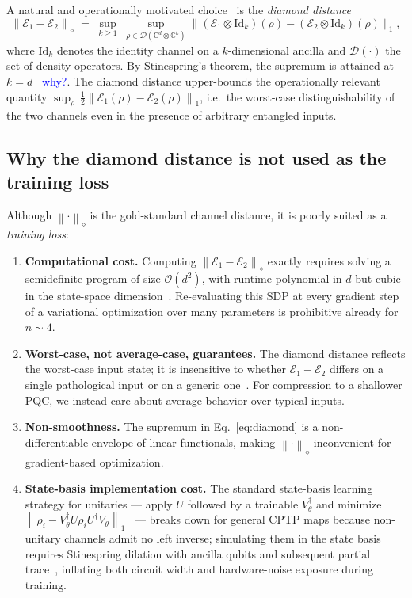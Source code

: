 \documentclass[%
 reprint,
superscriptaddress,
 amsmath,amssymb,
 aps,
]{revtex4-2}
\newcommand{\E}{\mathcal{E}}
\newcommand{\norm}[1]{\left\lVert#1\right\rVert}
\newcommand{\yijian}[1]{\textcolor{blue}{#1}}
\begin{document}
A natural and operationally motivated choice~\cite{kitaev1997quantum,watrous2018theory} is the \emph{diamond distance}
\begin{equation}
    \norm{\E_1 - \E_2}_{\diamond} \;=\; \sup_{k\ge 1}\;\sup_{\rho\in\mathcal{D}(\mathbb{C}^{d}\otimes \mathbb{C}^k)} \bigl\| (\E_1 \otimes \mathrm{Id}_k)(\rho) - (\E_2 \otimes \mathrm{Id}_k)(\rho) \bigr\|_1,
    \label{eq:diamond}
\end{equation}
where $\mathrm{Id}_k$ denotes the identity channel on a $k$-dimensional ancilla and $\mathcal{D}(\cdot)$ the set of density operators. By Stinespring's theorem, the supremum is attained at $k=d$~\cite{watrous2018theory} \yijian{why?}.  The diamond distance upper-bounds the operationally relevant quantity $\sup_\rho\,\tfrac{1}{2}\norm{\E_1(\rho)-\E_2(\rho)}_1$, i.e.\ the worst-case distinguishability of the two channels even in the presence of arbitrary entangled inputs.

\subsection{Why the diamond distance is not used as the training loss}

Although $\norm{\cdot}_\diamond$ is the gold-standard channel distance, it is poorly suited as a \emph{training loss}:
\begin{enumerate}
    \item \textbf{Computational cost.} Computing $\norm{\E_1-\E_2}_\diamond$ exactly requires solving a semidefinite program of size $\mathcal{O}(d^2)$, with runtime polynomial in $d$ but cubic in the state-space dimension~\cite{watrous2009sdp}. Re-evaluating this SDP at every gradient step of a variational optimization over many parameters is prohibitive already for $n\sim 4$.
    \item \textbf{Worst-case, not average-case, guarantees.} The diamond distance reflects the worst-case input state; it is insensitive to whether $\E_1-\E_2$ differs on a single pathological input or on a generic one~\cite{gilchrist2005distance,magesan2012characterizing}. For compression to a shallower PQC, we instead care about average behavior over typical inputs.
    \item \textbf{Non-smoothness.} The supremum in Eq.~\eqref{eq:diamond} is a non-differentiable envelope of linear functionals, making $\norm{\cdot}_\diamond$ inconvenient for gradient-based optimization.
    \item \textbf{State-basis implementation cost.} The standard state-basis learning strategy for unitaries --- apply $U$ followed by a trainable $V_\theta^\dagger$ and minimize $\norm{\rho_i - V_\theta^\dagger U\rho_i U^\dagger V_\theta}_1$~\cite{khatri2019qaqc,sharma2020noiseresilience} --- breaks down for general CPTP maps because non-unitary channels admit no left inverse; simulating them in the state basis requires Stinespring dilation with ancilla qubits and subsequent partial trace~\cite{nielsen2010quantum}, inflating both circuit width and hardware-noise exposure during training.
\end{enumerate}
\end{document}
